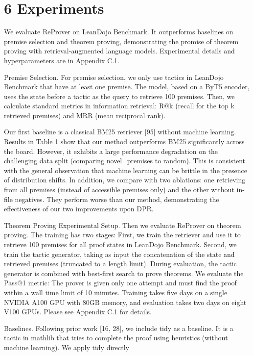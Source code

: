 \documentclass[
]{article}
\begin{document}
\section{6 Experiments}\label{experiments}

We evaluate ReProver on LeanDojo Benchmark. It outperforms baselines on
premise selection and theorem proving, demonstrating the promise of
theorem proving with retrieval-augmented language models. Experimental
details and hyperparameters are in Appendix C.1.

Premise Selection. For premise selection, we only use tactics in
LeanDojo Benchmark that have at least one premise. The model, based on a
ByT5 encoder, uses the state before a tactic as the query to retrieve
100 premises. Then, we calculate standard metrics in information
retrieval: R@k (recall for the top k retrieved premises) and MRR (mean
reciprocal rank).

Our first baseline is a classical BM25 retriever {[}95{]} without
machine learning. Results in Table 1 show that our method outperforms
BM25 significantly across the board. However, it exhibits a large
performance degradation on the challenging data split (comparing
novel\_premises to random). This is consistent with the general
observation that machine learning can be brittle in the presence of
distribution shifts. In addition, we compare with two ablations: one
retrieving from all premises (instead of accessible premises only) and
the other without in-file negatives. They perform worse than our method,
demonstrating the effectiveness of our two improvements upon DPR.

Theorem Proving Experimental Setup. Then we evaluate ReProver on theorem
proving. The training has two stages: First, we train the retriever and
use it to retrieve 100 premises for all proof states in LeanDojo
Benchmark. Second, we train the tactic generator, taking as input the
concatenation of the state and retrieved premises (truncated to a length
limit). During evaluation, the tactic generator is combined with
best-first search to prove theorems. We evaluate the Pass@1 metric: The
prover is given only one attempt and must find the proof within a wall
time limit of 10 minutes. Training takes five days on a single NVIDIA
A100 GPU with 80GB memory, and evaluation takes two days on eight V100
GPUs. Please see Appendix C.1 for details.

Baselines. Following prior work {[}16, 28{]}, we include tidy as a
baseline. It is a tactic in mathlib that tries to complete the proof
using heuristics (without machine learning). We apply tidy directly
\end{document}
